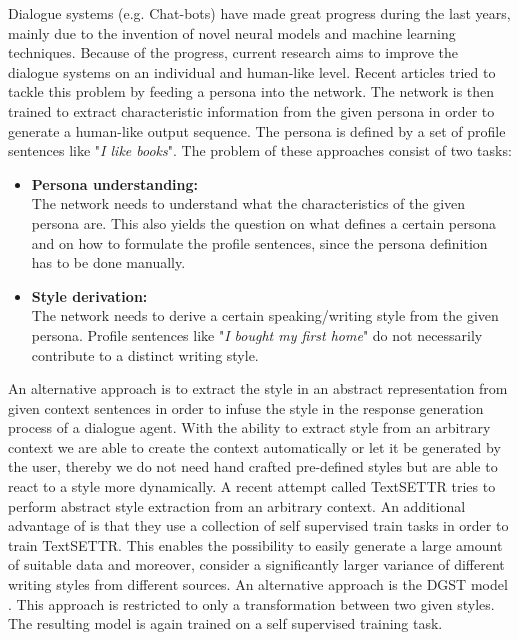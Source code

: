 \documentclass[twocolumn]{tum-article}
\begin{document}
Dialogue systems (e.g. Chat-bots) have made great progress during the last years, mainly due to the invention of novel neural models and machine learning techniques. Because of the progress, current research aims to improve the dialogue systems on an individual and human-like level. Recent articles \cite{DBLP:journals/corr/abs-1901-08149, liu2020impress} tried to tackle this problem by feeding a persona into the network. The network is then trained to extract characteristic information from the given persona in order to generate a human-like output sequence. The persona is defined by a set of profile sentences like "\textit{I like books}". The problem of these approaches consist of two tasks:
\begin{itemize}
\item \textbf{Persona understanding:}\\
The network needs to understand what the characteristics of the given persona are. This also yields the question on what defines a certain persona and on how to formulate the profile sentences, since the persona definition has to be done manually. 
\item \textbf{Style derivation:}\\
The network needs to derive a certain speaking/writing style from the given persona. Profile sentences like "\textit{I bought my first home}" \cite{liu2020impress} do not necessarily contribute to a distinct writing style.
\end{itemize}
An alternative approach is to extract the style in an abstract representation from given context sentences in order to infuse the style in the response generation process of a dialogue agent. With the ability to extract style from an arbitrary context we are able to create the context automatically or let it be generated by the user, thereby we do not need hand crafted pre-defined styles but are able to react to a style more dynamically. A recent attempt called TextSETTR \cite{riley2020textsettr} tries to perform abstract style extraction from an arbitrary context. An additional advantage of \cite{riley2020textsettr} is that they use a collection of self supervised train tasks in order to train TextSETTR. This enables the possibility to easily generate a large amount of suitable data and moreover, consider a significantly larger variance of different writing styles from different sources. 
An alternative approach is the DGST model \cite{li2020dgst}. This approach is restricted to only a transformation between two given styles. The resulting model is again trained on a self supervised training task.\\
\end{document}
